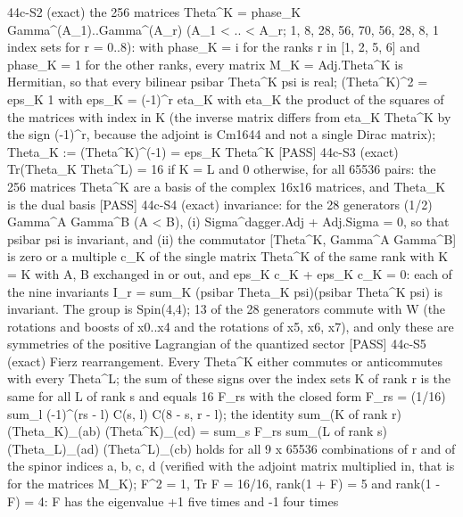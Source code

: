 \documentclass[
  10pt,
]{article}
\newenvironment{Shaded}{}{}
\newcommand{\NormalTok}[1]{#1}
\begin{document}
\begin{Shaded}
\begin{Highlighting}[]
\NormalTok{[PASS] 44c{-}S2  (exact) the 256 matrices Theta\^{}K = phase\_K Gamma\^{}(A\_1)..Gamma\^{}(A\_r) (A\_1 \textless{} .. \textless{} A\_r; 1, 8, 28, 56, 70, 56, 28, 8, 1 index sets for r = 0..8): with phase\_K = i for the ranks r in [1, 2, 5, 6] and phase\_K = 1 for the other ranks, every matrix M\_K = Adj.Theta\^{}K is Hermitian, so that every bilinear psibar Theta\^{}K psi is real; (Theta\^{}K)\^{}2 = eps\_K 1 with eps\_K = ({-}1)\^{}r eta\_K with eta\_K the product of the squares of the matrices with index in K (the inverse matrix differs from eta\_K Theta\^{}K by the sign ({-}1)\^{}r, because the adjoint is Cm1644 and not a single Dirac matrix); Theta\_K := (Theta\^{}K)\^{}({-}1) = eps\_K Theta\^{}K}
\NormalTok{[PASS] 44c{-}S3  (exact) Tr(Theta\_K Theta\^{}L) = 16 if K = L and 0 otherwise, for all 65536 pairs: the 256 matrices Theta\^{}K are a basis of the complex 16x16 matrices, and Theta\_K is the dual basis}
\NormalTok{[PASS] 44c{-}S4  (exact) invariance: for the 28 generators (1/2) Gamma\^{}A Gamma\^{}B (A \textless{} B), (i) Sigma\^{}dagger.Adj + Adj.Sigma = 0, so that psibar psi is invariant, and (ii) the commutator [Theta\^{}K, Gamma\^{}A Gamma\^{}B] is zero or a multiple c\_K of the single matrix Theta\^{}K\textquotesingle{} of the same rank with K\textquotesingle{} = K with A, B exchanged in or out, and eps\_K c\_K + eps\_K\textquotesingle{} c\_K\textquotesingle{} = 0: each of the nine invariants I\_r = sum\_K (psibar Theta\_K psi)(psibar Theta\^{}K psi) is invariant. The group is Spin(4,4); 13 of the 28 generators commute with W (the rotations and boosts of x0..x4 and the rotations of x5, x6, x7), and only these are symmetries of the positive Lagrangian of the quantized sector}
\NormalTok{[PASS] 44c{-}S5  (exact) Fierz rearrangement. Every Theta\^{}K either commutes or anticommutes with every Theta\^{}L; the sum of these signs over the index sets K of rank r is the same for all L of rank s and equals 16 F\_rs with the closed form F\_rs = (1/16) sum\_l ({-}1)\^{}(rs {-} l) C(s, l) C(8 {-} s, r {-} l); the identity sum\_(K of rank r) (Theta\_K)\_(ab) (Theta\^{}K)\_(cd) = sum\_s F\_rs sum\_(L of rank s) (Theta\_L)\_(ad) (Theta\^{}L)\_(cb) holds for all 9 x 65536 combinations of r and of the spinor indices a, b, c, d (verified with the adjoint matrix multiplied in, that is for the matrices M\_K); F\^{}2 = 1, Tr F = 16/16, rank(1 + F) = 5 and rank(1 {-} F) = 4: F has the eigenvalue +1 five times and {-}1 four times}

\end{Highlighting}
\end{Shaded}
\end{document}
